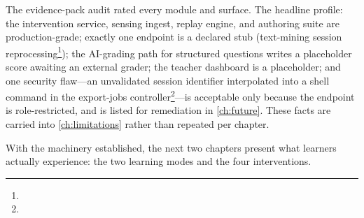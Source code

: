 The evidence-pack audit rated every module and surface. The headline
profile: the intervention service, sensing ingest, replay engine, and
authoring suite are production-grade; exactly one endpoint is a declared
stub (text-mining session
reprocessing\footnote{});
the AI-grading path for structured questions writes a placeholder score
awaiting an external grader; the teacher dashboard is a placeholder; and
one security flaw---an unvalidated session identifier interpolated into a
shell command in the export-jobs
controller\footnote{}---is
acceptable only because the endpoint is role-restricted, and is listed
for remediation in \cref{ch:future}. These facts are carried into
\cref{ch:limitations} rather than repeated per chapter.

\medskip
\noindent With the machinery established, the next two chapters present
what learners actually experience: the two learning modes and the four
interventions.
